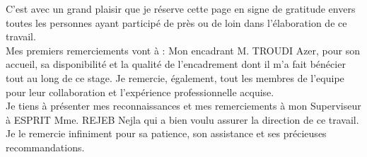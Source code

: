 {}
\begin{center}
\end{center}
\vspace{0.8cm}        %

C’est avec un grand plaisir que je réserve cette page en signe de gratitude envers toutes les
personnes ayant participé de près ou de loin dans l’élaboration de ce travail.
\\
Mes premiers remerciements vont à : Mon encadrant M. TROUDI Azer, pour son accueil, sa disponibilité et la qualité de l’encadrement dont il m’a fait bénécier tout au long de ce stage.
Je remercie, également, tout les membres de l'equipe pour leur collaboration et l’expérience professionnelle acquise.
\\
Je tiens à présenter mes reconnaissances et mes remerciements à mon Superviseur à ESPRIT Mme. REJEB Nejla qui a bien voulu assurer la direction de ce travail. Je le remercie infiniment pour sa patience, son assistance et ses précieuses recommandations.